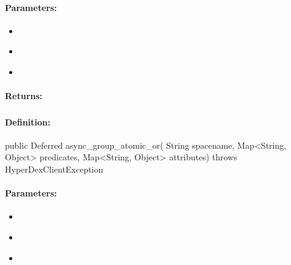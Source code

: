 \paragraph{Parameters:}
\begin{itemize}[noitemsep]
\item {}\\

\item {}\\

\item {}\\

\end{itemize}

\paragraph{Returns:}


\pagebreak
\subsubsection{}
\label{api:java:async_group_atomic_or}


\paragraph{Definition:}
\begin{javacode}
public Deferred async_group_atomic_or(
        String spacename,
        Map<String, Object> predicates,
        Map<String, Object> attributes) throws HyperDexClientException
\end{javacode}

\paragraph{Parameters:}
\begin{itemize}[noitemsep]
\item {}\\

\item {}\\

\item {}\\

\end{itemize}

